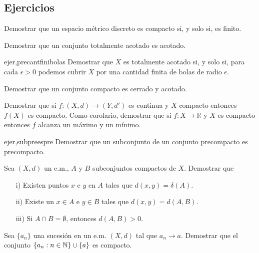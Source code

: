  \subsection{Ejercicios}
 
 

\begin{ejercicio}{} Demostrar que un espacio métrico discreto es compacto
si, y solo si, es finito.
\end{ejercicio}

\begin{ejercicio}{} Demostrar que un conjunto totalmente acotado es
acotado.
\end{ejercicio}



\begin{ejercicio}{ejer,precantfinibolas} Demostrar que $X$ es totalmente acotado si, y
solo si, para cada $\epsilon>0$ podemos cubrir $X$ por una cantidad
finita de bolas de radio $\epsilon$.
\end{ejercicio}

\begin{ejercicio}{} Demostrar que un conjunto compacto es cerrado y
acotado.
\end{ejercicio}

\begin{ejercicio}{} Demostrar que si $f:(X,d)\to (Y,d')$ es continua
y $X$ compacto entonces $f(X)$ es compacto. Como corolario,
demostrar que si $f:X\to\mathbb{R}$ y $X$ es compacto entonces $f$
alcanza un máximo y un mínimo.
\end{ejercicio}

\begin{ejercicio}{ejer,subpreespre} Demostrar que un
subconjunto de un conjunto precompacto es precompacto.
\end{ejercicio}

\begin{ejercicio}{} Sea $(X,d)$ un e.m., $A$ y $B$ subconjuntos compactos de
$X$. Demostrar que
\begin{itemize}
    \item[i)] Existen puntos $x$ e $y$ en $A$ tales que $d(x,y)=\delta(A)$.
    \item[ii)] Existe un $x\in A$ e $y\in B$ tales que
    $d(x,y)=d(A,B)$.
    \item[iii)] Si $A\cap B=\emptyset$, entonces $d(A,B)>0$.
\end{itemize}
\end{ejercicio}
\begin{ejercicio}{} Sea $\{a_n\}$ una sucesi\'on en un e.m. $(X,d)$
tal que $a_n\to a$. Demostrar que el conjunto
$\{a_n:n\in\mathbb{N}\}\cup\{a\}$ es compacto.
\end{ejercicio}

